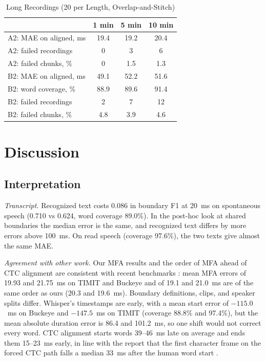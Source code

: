 \documentclass[conference,a4paper]{IEEEtran}
\begin{document}
\begin{table}[t]
\caption{Long Recordings (20 per Length, Overlap-and-Stitch)}
\label{tab:long}
\centering
\footnotesize
\begin{tabular}{lccc}
\toprule
& 1 min & 5 min & 10 min\\
\midrule
A2: MAE on aligned, ms & 19.4 & 19.2 & 20.4\\
A2: failed recordings & 0 & 3 & 6\\
A2: failed chunks, \% & 0 & 1.5 & 1.3\\
\midrule
B2: MAE on aligned, ms & 49.1 & 52.2 & 51.6\\
B2: word coverage, \% & 88.9 & 89.6 & 91.4\\
B2: failed recordings & 2 & 7 & 12\\
B2: failed chunks, \% & 4.8 & 3.9 & 4.6\\
\bottomrule
\end{tabular}
\end{table}

\section{Discussion}
\subsection{Interpretation}
\emph{Transcript.} Recognized text costs 0.086 in boundary F1 at 20~ms on spontaneous speech (0.710 vs 0.624, word coverage 89.0\%). In the post-hoc look at shared boundaries the median error is the same, and recognized text differs by more errors above 100~ms. On read speech (coverage 97.6\%), the two texts give almost the same MAE.

\emph{Agreement with other work.} Our MFA results and the order of MFA ahead of CTC alignment are consistent with recent benchmarks \cite{Chu2026FABench,Zolkepli2026,McAuliffe2026,Rousso2024}: mean MFA errors of 19.93 and 21.75~ms on TIMIT and Buckeye \cite{McAuliffe2026} and of 19.1 and 21.0~ms \cite{Zolkepli2026} are of the same order as ours (20.3 and 19.6~ms). Boundary definitions, clips, and speaker splits differ. Whisper's timestamps are early, with a mean start error of $-115.0$~ms on Buckeye and $-147.5$~ms on TIMIT (coverage 88.8\% and 97.4\%), but the mean absolute duration error is 86.4 and 101.2~ms, so one shift would not correct every word. CTC alignment starts words 39--46~ms late on average and ends them 15--23~ms early, in line with the report that the first character frame on the forced CTC path falls a median 33~ms after the human word start \cite{Zolkepli2026}.
\end{document}
